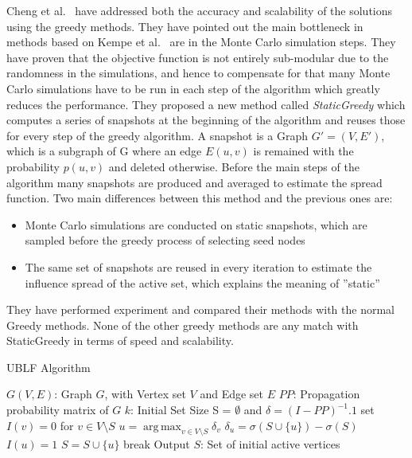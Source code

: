 \documentclass[english]{tktltiki}
\DeclareMathOperator*{\argmax}{arg\,max}
\begin{document}
Cheng et al.\ \cite{cheng13} have addressed both the accuracy and scalability of the solutions using the greedy methods. 
They have pointed out the main bottleneck in methods based on Kempe et al.\ \cite{kempe03} are in the Monte Carlo simulation steps. 
They have proven that the objective function is not entirely sub-modular due to the randomness in the simulations, and hence to compensate for that many Monte Carlo simulations have to be run in each step of the algorithm which greatly reduces the performance.
They proposed a new method called \textit{StaticGreedy} which computes a series of snapshots at the beginning of the algorithm and reuses those for every step of the greedy algorithm. 
A snapshot is a Graph $G'=(V,E')$, which is a subgraph of G where an edge $E(u,v)$ is remained with the probability $p(u,v)$ and deleted otherwise. 
Before the main steps of the algorithm many snapshots are produced and averaged to estimate the spread function. 
Two main differences between this method and the previous ones are:
\begin{itemize}
\item
Monte Carlo simulations are conducted on static snapshots, which are sampled before the greedy process of selecting seed nodes
\item
The same set of snapshots are reused in every iteration to estimate the influence spread of the active set, which explains the meaning of ''static''
\end{itemize}
They have performed experiment and compared their methods with the normal Greedy methods. 
None of the other greedy methods are any match with StaticGreedy in terms of speed and scalability.
\begin{algorithm}[ht!]
\caption{UBLF Algorithm  \cite{zhuo13}}
\label{alg:ublf}
\begin{algorithmic}
\Require $G(V,E)$: Graph $G$, with Vertex set $V$ and Edge set $E$
\Require $PP$: Propagation probability matrix of $G$
\Require $k$: Initial Set Size
\State S = $\emptyset$ and $\delta = (I - PP)^{-1} .1$ 
	\State set $I(v) = 0$ for $v \in V \setminus S$
		\State $u =  \argmax_{v \in V \setminus S}\delta_v$ 
			\State $\delta_u = \sigma( S \cup \{u\}) - \sigma(S)$
			\State $I(u)=1$
		\EndIf
			\State $S = S \cup \{u\}$
			\State break
		\EndIf
	\EndWhile 
\EndFor
\State Output $S$: Set of initial active vertices
\end{algorithmic}
\end{algorithm}
\end{document}
